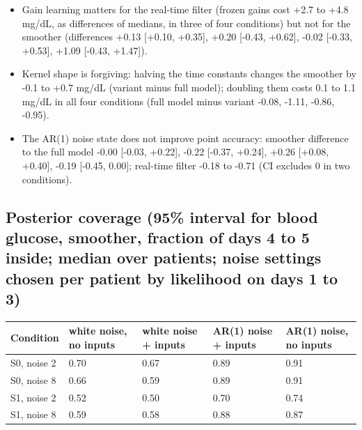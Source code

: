 \documentclass[11pt,a4paper]{article}
\providecommand{\tightlist}{\setlength{\itemsep}{0pt}\setlength{\parskip}{0pt}}
\begin{document}
\begin{itemize}
\tightlist
\item
  Gain learning matters for the real-time filter (frozen gains cost +2.7
  to +4.8 mg/dL, as differences of medians, in three of four conditions)
  but not for the smoother (differences +0.13 {[}+0.10, +0.35{]}, +0.20
  {[}-0.43, +0.62{]}, -0.02 {[}-0.33, +0.53{]}, +1.09 {[}-0.43,
  +1.47{]}).
\item
  Kernel shape is forgiving: halving the time constants changes the
  smoother by -0.1 to +0.7 mg/dL (variant minus full model); doubling
  them costs 0.1 to 1.1 mg/dL in all four conditions (full model minus
  variant -0.08, -1.11, -0.86, -0.95).
\item
  The AR(1) noise state does not improve point accuracy: smoother
  difference to the full model -0.00 {[}-0.03, +0.22{]}, -0.22 {[}-0.37,
  +0.24{]}, +0.26 {[}+0.08, +0.40{]}, -0.19 {[}-0.45, 0.00{]}; real-time
  filter -0.18 to -0.71 (CI excludes 0 in two conditions).
\end{itemize}

\hypertarget{posterior-coverage-95-interval-for-blood-glucose-smoother-fraction-of-days-4-to-5-inside-median-over-patients-noise-settings-chosen-per-patient-by-likelihood-on-days-1-to-3}{%
\subsection{Posterior coverage (95\% interval for blood glucose,
smoother, fraction of days 4 to 5 inside; median over patients; noise
settings chosen per patient by likelihood on days 1 to
3)}\label{posterior-coverage-95-interval-for-blood-glucose-smoother-fraction-of-days-4-to-5-inside-median-over-patients-noise-settings-chosen-per-patient-by-likelihood-on-days-1-to-3}}

\begin{longtable}[]{@{}lllll@{}}
\toprule\noalign{}
Condition & white noise, no inputs & white noise + inputs & AR(1) noise
+ inputs & AR(1) noise, no inputs \\
\midrule\noalign{}
\endhead
\bottomrule\noalign{}
\endlastfoot
S0, noise 2 & 0.70 & 0.67 & 0.89 & 0.91 \\
S0, noise 8 & 0.66 & 0.59 & 0.89 & 0.91 \\
S1, noise 2 & 0.52 & 0.50 & 0.70 & 0.74 \\
S1, noise 8 & 0.59 & 0.58 & 0.88 & 0.87 \\
\end{longtable}
\end{document}
